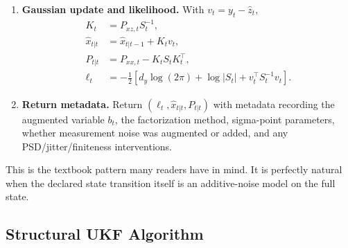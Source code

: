 \begin{enumerate}[label=\textbf{U\arabic*.}]
\begin{align}
      P_{xz,t} &=
        \sum_j w_j^{(c)}
        (x_t^{(j)}-\hat x_{t|t-1})(z_t^{(j)}-\hat z_t)^\top,
    \end{align}
    where $R_t^{\mathrm{add}}=0$ if measurement noise was included in $b_t$ and
    $R_t^{\mathrm{add}}=R_t$ otherwise.
  \item \textbf{Gaussian update and likelihood.}  With
    $v_t=y_t-\hat z_t$,
    \begin{align}
      K_t &= P_{xz,t}S_t^{-1},\\
      \hat x_{t|t} &= \hat x_{t|t-1}+K_tv_t,\\
      P_{t|t} &= P_{xx,t}-K_tS_tK_t^\top,\\
      \ell_t &=
      -\frac{1}{2}
      \left[
        d_y\log(2\pi)+\log|S_t|+v_t^\top S_t^{-1}v_t
      \right].
    \end{align}
  \item \textbf{Return metadata.}  Return
    $(\ell_t,\hat x_{t|t},P_{t|t})$ with metadata recording the augmented
    variable $b_t$, the factorization method, sigma-point parameters, whether
    measurement noise was augmented or added, and any PSD/jitter/finiteness
    interventions.
\end{enumerate}
This is the textbook pattern many readers have in mind.  It is perfectly
natural when the declared state transition itself is an additive-noise model on
the full state.

\subsection{Structural UKF Algorithm}
\label{sec:bf-structural-ukf-algorithm}

